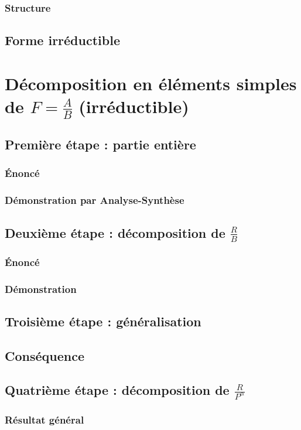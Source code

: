 \documentclass[12pt,a4paper,french]{book}
\begin{document}
			\subsubsection{Structure}
		\subsection{Forme irréductible}
	\section{Décomposition en éléments simples de $F = \frac{A}{B}$ (irréductible)}
		\subsection{Première étape : partie entière}
			\subsubsection{Énoncé}
			\subsubsection{Démonstration par Analyse-Synthèse}
		\subsection{Deuxième étape : décomposition de $\frac{R}{B}$}
			\subsubsection{Énoncé}
			\subsubsection{Démonstration}
		\subsection{Troisième étape : généralisation}
		\subsection{Conséquence}
		\subsection{Quatrième étape : décomposition de $\frac{R}{P^{\alpha}}$}
			\subsubsection{Résultat général}
\end{document}
